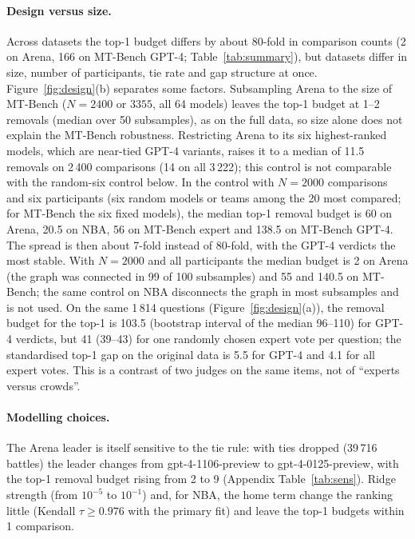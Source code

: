 \documentclass{article}
\begin{document}
\paragraph{Design versus size.}
Across datasets the top-1 budget differs by about 80-fold in comparison counts (2 on Arena, 166 on MT-Bench GPT-4; Table~\ref{tab:summary}), but datasets differ in size, number of participants, tie rate and gap structure at once. Figure~\ref{fig:design}(b) separates some factors. Subsampling Arena to the size of MT-Bench ($N=2400$ or $3355$, all 64 models) leaves the top-1 budget at 1--2 removals (median over 50 subsamples), as on the full data, so size alone does not explain the MT-Bench robustness. Restricting Arena to its six highest-ranked models, which are near-tied GPT-4 variants, raises it to a median of 11.5 removals on 2\,400 comparisons (14 on all 3\,222); this control is not comparable with the random-six control below. In the control with $N=2000$ comparisons and six participants (six random models or teams among the 20 most compared; for MT-Bench the six fixed models), the median top-1 removal budget is 60 on Arena, 20.5 on NBA, 56 on MT-Bench expert and 138.5 on MT-Bench GPT-4. The spread is then about 7-fold instead of 80-fold, with the GPT-4 verdicts the most stable. With $N=2000$ and all participants the median budget is 2 on Arena (the graph was connected in 99 of 100 subsamples) and 55 and 140.5 on MT-Bench; the same control on NBA disconnects the graph in most subsamples and is not used. On the same 1\,814 questions (Figure~\ref{fig:design}(a)), the removal budget for the top-1 is 103.5 (bootstrap interval of the median 96--110) for GPT-4 verdicts, but 41 (39--43) for one randomly chosen expert vote per question; the standardised top-1 gap on the original data is 5.5 for GPT-4 and 4.1 for all expert votes. This is a contrast of two judges on the same items, not of ``experts versus crowds''.

\paragraph{Modelling choices.}
The Arena leader is itself sensitive to the tie rule: with ties dropped (39\,716 battles) the leader changes from gpt-4-1106-preview to gpt-4-0125-preview, with the top-1 removal budget rising from 2 to 9 (Appendix Table~\ref{tab:sens}). Ridge strength (from $10^{-5}$ to $10^{-1}$) and, for NBA, the home term change the ranking little (Kendall $\tau\ge0.976$ with the primary fit) and leave the top-1 budgets within 1 comparison.
\end{document}
